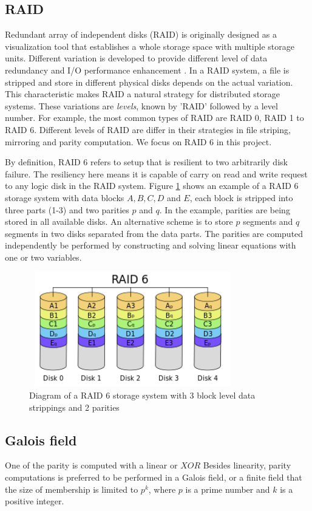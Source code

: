 \subsection{RAID}
Redundant array of independent disks (RAID) is originally designed as a visualization tool that establishes a whole storage space with multiple storage units. Different variation is developed to provide different level of data redundancy and I/O performance enhancement \cite{arpaci2012operating}. In a RAID system, a file is stripped and store in different physical disks depends on the actual variation. This characteristic makes RAID a natural strategy for distributed storage systems. These variations are \textit{levels}, known by 'RAID' followed by a level number. For example, the most common types of RAID are RAID 0, RAID 1 to RAID 6. Different levels of RAID are differ in their strategies in file striping, mirroring and parity computation. We focus on RAID 6 in this project.

By definition, RAID 6 refers to setup that is resilient to two arbitrarily disk failure. The resiliency here means it is capable of carry on read and write request to any logic disk in the RAID system. Figure \ref{fig:raid6} shows an example of a RAID 6 storage system with data blocks $A, B, C, D$ and $E$, each block is stripped into three parts (1-3) and two parities $p$ and $q$. In the example, parities are being stored in all available disks. An alternative scheme is to store $p$ segments and $q$ segments in two disks separated from the data parts. The parities are computed independently be performed by constructing and solving linear equations with one or two variables. 

\begin{figure}[t]
	\includegraphics[width=9cm,height=5cm,angle=0]{RAID6.png}
	\caption{Diagram of a RAID 6 storage system with 3 block level data strippings and 2 parities \cite{wiki:raid} }
	\label{fig:raid6}
\end{figure}

\subsection{Galois field}
One of the parity is computed with a linear or $XOR$ 
Besides linearity, parity computations is preferred to be performed in a Galois field, or a finite field that the size of membership is limited to $p^k$, where $p$ is a prime number and $k$ is a positive integer. 

